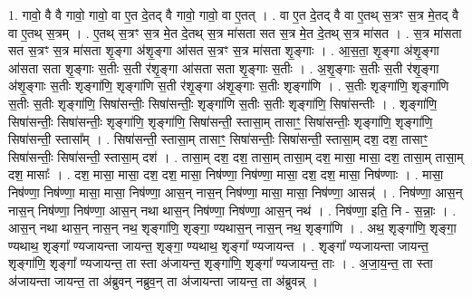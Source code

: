 \documentclass[17pt]{extarticle}
\begin{document}
1. गावो॒ वै वै गावो॒ गावो॒ वा ए॒त दे॒तद् वै गावो॒ गावो॒ वा ए॒तत् । . वा ए॒त दे॒तद् वै वा ए॒तथ् स॒त्रꣳ स॒त्र मे॒तद् वै वा ए॒तथ् स॒त्रम् । . ए॒तथ् स॒त्रꣳ स॒त्र मे॒त दे॒तथ् स॒त्र मा॑सता सत स॒त्र मे॒त दे॒तथ् स॒त्र मा॑सत । . स॒त्र मा॑सता सत स॒त्रꣳ स॒त्र मा॑सता शृ॒ङ्गा अ॑शृ॒ङ्गा आ॑सत स॒त्रꣳ स॒त्र मा॑सता शृ॒ङ्गाः । . आ॒स॒ता॒ शृ॒ङ्गा अ॑शृ॒ङ्गा आ॑सता सता शृ॒ङ्गाः स॒तीः स॒ती र॑शृ॒ङ्गा आ॑सता सता शृ॒ङ्गाः स॒तीः । . अ॒शृ॒ङ्गाः स॒तीः स॒ती र॑शृ॒ङ्गा अ॑शृ॒ङ्गाः स॒तीः शृङ्गा॑णि॒ शृङ्गा॑णि स॒ती र॑शृ॒ङ्गा अ॑शृ॒ङ्गाः स॒तीः शृङ्गा॑णि । . स॒तीः शृङ्गा॑णि॒ शृङ्गा॑णि स॒तीः स॒तीः शृङ्गा॑णि॒ सिषा॑सन्तीः॒ सिषा॑सन्तीः॒ शृङ्गा॑णि स॒तीः स॒तीः शृङ्गा॑णि॒ सिषा॑सन्तीः । . शृङ्गा॑णि॒ सिषा॑सन्तीः॒ सिषा॑सन्तीः॒ शृङ्गा॑णि॒ शृङ्गा॑णि॒ सिषा॑सन्ती॒ स्तासा॒म् तासाꣳ॒॒ सिषा॑सन्तीः॒ शृङ्गा॑णि॒ शृङ्गा॑णि॒ सिषा॑सन्ती॒ स्तासा᳚म् । . सिषा॑सन्ती॒ स्तासा॒म् तासाꣳ॒॒ सिषा॑सन्तीः॒ सिषा॑सन्ती॒ स्तासा॒म् दश॒ दश॒ तासाꣳ॒॒ सिषा॑सन्तीः॒ सिषा॑सन्ती॒ स्तासा॒म् दश॑ । . तासा॒म् दश॒ दश॒ तासा॒म् तासा॒म् दश॒ मासा॒ मासा॒ दश॒ तासा॒म् तासा॒म् दश॒ मासाः᳚ । . दश॒ मासा॒ मासा॒ दश॒ दश॒ मासा॒ निष॑ण्णा॒ निष॑ण्णा॒ मासा॒ दश॒ दश॒ मासा॒ निष॑ण्णाः । . मासा॒ निष॑ण्णा॒ निष॑ण्णा॒ मासा॒ मासा॒ निष॑ण्णा॒ आस॒न् नास॒न् निष॑ण्णा॒ मासा॒ मासा॒ निष॑ण्णा॒ आसन्न्॑ । . निष॑ण्णा॒ आस॒न् नास॒न् निष॑ण्णा॒ निष॑ण्णा॒ आस॒न् नथा थास॒न् निष॑ण्णा॒ निष॑ण्णा॒ आस॒न् नथ॑ । . निष॑ण्णा॒ इति॒ नि - स॒न्नाः॒ । . आस॒न् नथा थास॒न् नास॒न् नथ॒ शृङ्गा॑णि॒ शृङ्गा॒ ण्यथास॒न् नास॒न् नथ॒ शृङ्गा॑णि । . अथ॒ शृङ्गा॑णि॒ शृङ्गा॒ ण्यथाथ॒ शृङ्गा᳚ ण्यजायन्ता जायन्त॒ शृङ्गा॒ ण्यथाथ॒ शृङ्गा᳚ ण्यजायन्त । . शृङ्गा᳚ ण्यजायन्ता जायन्त॒ शृङ्गा॑णि॒ शृङ्गा᳚ ण्यजायन्त॒ ता स्ता अ॑जायन्त॒ शृङ्गा॑णि॒ शृङ्गा᳚ ण्यजायन्त॒ ताः । . अ॒जा॒य॒न्त॒ ता स्ता अ॑जायन्ता जायन्त॒ ता अ॑ब्रुवन् नब्रुव॒न् ता अ॑जायन्ता जायन्त॒ ता अ॑ब्रुवन्न् । \newline
\end{document}

